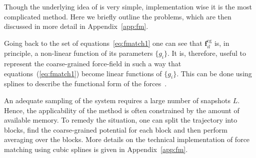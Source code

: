Though the underlying idea of \fm is very simple, implementation wise it is the most complicated method. Here we briefly outline the problems, which are then discussed in more detail in Appendix~\ref{app:fm}.

Going back to the set of equations~\ref{eq:fmatch1} one can see that ${\bm f}_{il}^\text{cg}$ is, in principle, a non-linear function of its parameters $\{g_i\}$. It is, therefore, useful to represent the coarse-grained force-field in such a way that equations~(\ref{eq:fmatch1}) become linear functions of $\{g_i\}$. This can be done using splines to describe the functional form of the forces~\cite{Izvekov:2005}.

An adequate sampling of the system requires a large number of snapshots $L$. Hence, the applicability of the method is often constrained by the amount of available memory. To remedy the situation, one can split the trajectory into blocks, find the coarse-grained potential for each block and then perform averaging over the blocks. More details on the technical implementation of force matching using cubic splines is given in Appendix~\ref{app:fm}.
